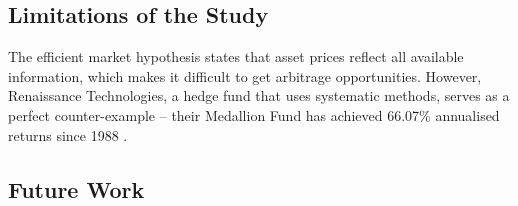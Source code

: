 \documentclass[a4paper, 11pt]{article}
\begin{document}
\subsection{Limitations of the Study}
The efficient market hypothesis states that asset prices reflect all available information, which makes it difficult to get arbitrage opportunities. However, Renaissance Technologies, a hedge fund that uses systematic methods, serves as a perfect counter-example -- their Medallion Fund has achieved 66.07\% annualised returns since 1988 \cite{cornell2020medallion}.

\subsection{Future Work}



\end{document}
